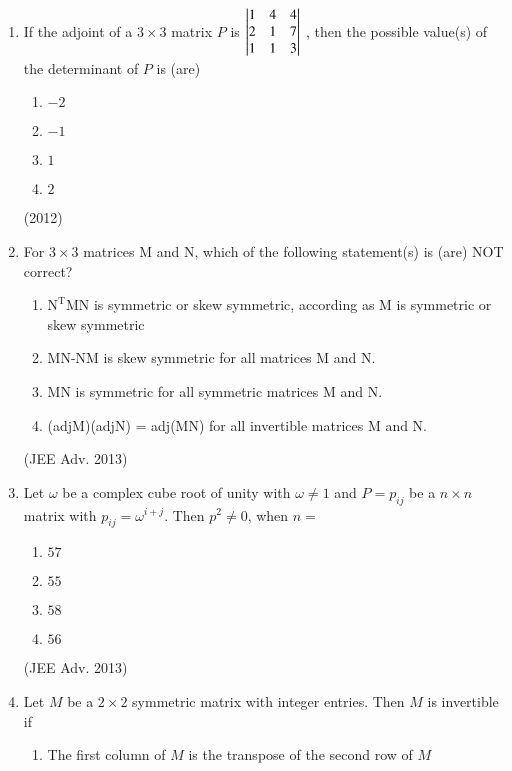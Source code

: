 \documentclass[journal,12pt,twocolumn]{IEEEtran}
\theoremstyle{remark}
\begin{document}
\begin{enumerate}[label=\arabic*)]
				\item 
					If the adjoint of a $3 \times 3$ matrix $P$ is 
							$\begin{vmatrix}	
								1&4&4\\
								2&1&7\\
								1&1&3
							\end{vmatrix}$
					, then the possible value(s) of the determinant of $P$ is (are)
						\begin{enumerate}[label=(\alph*)]
							\item $-2$
							\item $-1$
							\item $1$
							\item $2$
						\end{enumerate}
						\hfill (2012)\\
				\item 
					For $3 \times 3$ matrices M and N, which of the following statement(s) is (are) NOT correct?
						\begin{enumerate}[label=(\alph*)]
							\item $\mathrm{N^TMN}$ is symmetric or skew symmetric, according as M is symmetric or skew symmetric
							\item MN-NM is skew symmetric for all matrices M and N.
							\item MN is symmetric for all symmetric matrices M and N.
							\item (adjM)(adjN) = adj(MN) for all invertible matrices M and N.
						\end{enumerate}
						\hfill (JEE Adv. 2013)\\
				\item 
					Let $\omega$ be a complex cube root of unity with $\omega \neq 1 $ and $P={p_{ij}}$ be a $n \times n$ matrix with $p_{ij} = \omega^{i+j}$. Then $p^2 \neq 0$, when $n=$
					\begin{enumerate}[label=(\alph*)]
						\item $57$
						\item $55 $
						\item $58$
						\item $56$
					\end{enumerate}
					\hfill (JEE Adv. 2013)\\
				\item 
					Let $M$ be a $2 \times 2$ symmetric matrix with integer entries. Then $M$ is invertible if
						\begin{enumerate}[label=(\alph*)]
							\item The first column of $M$ is the transpose of the second row of $M$

\end{enumerate}
\end{enumerate}
\end{document}
